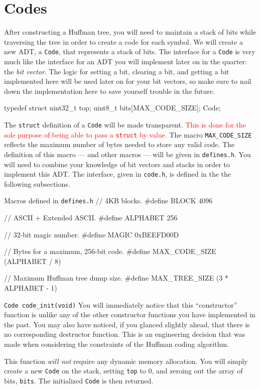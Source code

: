 \section{Codes}

After constructing a Huffman tree, you will need to maintain a stack of
bits while traversing the tree in order to create a code for each
symbol. We will create a new ADT, a \texttt{Code}, that represents a
stack of bits. The interface for a \texttt{Code} is very much like the
interface for an ADT you will implement later on in the quarter: the
\emph{bit vector}. The logic for setting a bit, clearing a bit, and
getting a bit implemented here will be used later on for your bit
vectors, so make sure to nail down the implementation here to save
yourself trouble in the future.

\begin{clisting}{}
typedef struct {
    uint32_t top;
    uint8_t bits[MAX_CODE_SIZE];
} Code;
\end{clisting}

The \texttt{struct} definition of a \texttt{Code} will be made
transparent. \textcolor{red}{This is done for the sole purpose of being
able to pass a \texttt{struct} by value.} The macro
\texttt{MAX\_CODE\_SIZE} reflects the maximum number of bytes needed to
store any valid code. The definition of this macro --- and other macros
--- will be given in \texttt{defines.h}. You will need to combine your
knowledge of bit vectors and stacks in order to implement this ADT. The
interface, given in \texttt{code.h}, is defined in the the following
subsections.

\begin{clisting}{Macros defined in \texttt{defines.h}}
// 4KB blocks.
#define BLOCK 4096

// ASCII + Extended ASCII.
#define ALPHABET 256

// 32-bit magic number.
#define MAGIC 0xBEEFD00D

// Bytes for a maximum, 256-bit code.
#define MAX_CODE_SIZE (ALPHABET / 8)

// Maximum Huffman tree dump size.
#define MAX_TREE_SIZE (3 * ALPHABET - 1)
\end{clisting}

\begin{funcdoc}{\texttt{Code code\_init(void)}}
  You will immediately notice that this ``constructor'' function is
  unlike any of the other constructor functions you have implemented in
  the past. You may also have noticed, if you glanced slightly ahead,
  that there is no corresponding destructor function. This is an
  engineering decision that was made when considering the constraints of
  the Huffman coding algorithm.

  This function \emph{will not} require any dynamic memory allocation.
  You will simply create a new \texttt{Code} on the stack, setting
  \texttt{top} to 0, and zeroing out the array of bits, \texttt{bits}.
  The initialized \texttt{Code} is then returned.
\end{funcdoc}

